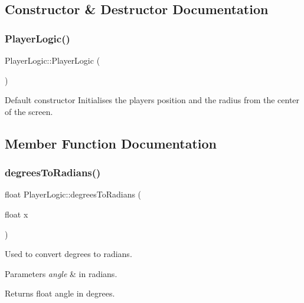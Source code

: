 \subsection{Constructor \& Destructor Documentation}
\mbox{\label{class_player_logic_aa14c9bac512df3d01ea4db0224e82405}} 
\subsubsection{\texorpdfstring{Player\+Logic()}{PlayerLogic()}}
{\footnotesize\ttfamily Player\+Logic\+::\+Player\+Logic (\begin{DoxyParamCaption}{ }\end{DoxyParamCaption})}

Default constructor Initialises the players position and the radius from the center of the screen. 

\subsection{Member Function Documentation}
\mbox{\label{class_player_logic_a425e0b7a5a4495958a41383525f059eb}} 
\subsubsection{\texorpdfstring{degrees\+To\+Radians()}{degreesToRadians()}}
{\footnotesize\ttfamily float Player\+Logic\+::degrees\+To\+Radians (\begin{DoxyParamCaption}\item[{float}]{x }\end{DoxyParamCaption})}



Used to convert degrees to radians. 


\begin{DoxyParams}{Parameters}
{\em angle} & in radians. \\
\hline
\end{DoxyParams}
\begin{DoxyReturn}{Returns}
float angle in degrees. 
\end{DoxyReturn}
\mbox{\label{class_player_logic_a6bdec8d007701c16a3cbb87e7fdfe0e6}} 
